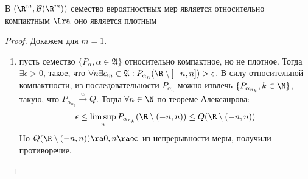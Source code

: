 \begin{theorem}[Прохорова]
    В \((\R^m, \mathcal{B}(\R^m))\) семество вероятностных мер является относительно компактным \(\Lra\) оно является плотным
\end{theorem}
\begin{proof}
    Докажем для \(m = 1\).
    \begin{enumerate}
        \item[\(\Ra\)] пусть семество \(\{P_\alpha, \alpha \in \mathfrak{A}\}\) относительно компактное, но не плотное. Тогда \(\exists \epsilon > 0\), такое, что \(\forall n \exists \alpha_n \in \mathfrak{A}: P_{\alpha_n}(\R\setminus [-n, n]) > \epsilon\). В силу относительной компактности, из последовательности \(P_{\alpha_n}\) можно извлечь \(\{P_{\alpha_{n_k}}, k \in \N\}\), такую, что \(P_{\alpha_{n_k}} \xrightarrow{w} Q\). Тогда \(\forall n \in \N\) по теореме Алексанрова:
        \[\epsilon \le \limsup_n P_{\alpha_{n_k}}(\R\setminus(-n, n)) \le Q(\R\setminus(-n, n))\]
        Но \(Q(\R\setminus(-n, n)) \ra 0, n \ra \infty\) из непрерывности меры, получили противоречие.


\end{enumerate}
\end{proof}
